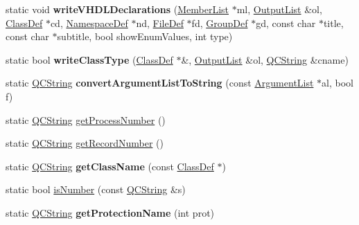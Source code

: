 \begin{DoxyCompactItemize}
static void {\bfseries write\+V\+H\+D\+L\+Declarations} (\mbox{\hyperlink{class_member_list}{Member\+List}} $\ast$ml, \mbox{\hyperlink{class_output_list}{Output\+List}} \&ol, \mbox{\hyperlink{class_class_def}{Class\+Def}} $\ast$cd, \mbox{\hyperlink{class_namespace_def}{Namespace\+Def}} $\ast$nd, \mbox{\hyperlink{class_file_def}{File\+Def}} $\ast$fd, \mbox{\hyperlink{class_group_def}{Group\+Def}} $\ast$gd, const char $\ast$title, const char $\ast$subtitle, bool show\+Enum\+Values, int type)
\item 
\mbox{\label{class_vhdl_doc_gen_a201149bb595839029a622100737e0dea}} 
static bool {\bfseries write\+Class\+Type} (\mbox{\hyperlink{class_class_def}{Class\+Def}} $\ast$\&, \mbox{\hyperlink{class_output_list}{Output\+List}} \&ol, \mbox{\hyperlink{class_q_c_string}{Q\+C\+String}} \&cname)
\item 
\mbox{\label{class_vhdl_doc_gen_aa77f9467a8af575f85643ececc8cf4e3}} 
static \mbox{\hyperlink{class_q_c_string}{Q\+C\+String}} {\bfseries convert\+Argument\+List\+To\+String} (const \mbox{\hyperlink{class_argument_list}{Argument\+List}} $\ast$al, bool f)
\item 
static \mbox{\hyperlink{class_q_c_string}{Q\+C\+String}} \mbox{\hyperlink{class_vhdl_doc_gen_a6524e8718f3f956610df4dfc71be204c}{get\+Process\+Number}} ()
\item 
static \mbox{\hyperlink{class_q_c_string}{Q\+C\+String}} \mbox{\hyperlink{class_vhdl_doc_gen_a2e65f831a03ff54d13240da96843cd60}{get\+Record\+Number}} ()
\item 
\mbox{\label{class_vhdl_doc_gen_a2c4458b0e27e9b97db254d082d1487d2}} 
static \mbox{\hyperlink{class_q_c_string}{Q\+C\+String}} {\bfseries get\+Class\+Name} (const \mbox{\hyperlink{class_class_def}{Class\+Def}} $\ast$)
\item 
static bool \mbox{\hyperlink{class_vhdl_doc_gen_a37b3bf29e7ec4cfe5c453f5a5d4e8f71}{is\+Number}} (const \mbox{\hyperlink{class_q_c_string}{Q\+C\+String}} \&s)
\item 
\mbox{\label{class_vhdl_doc_gen_a4325f5840fe29089b4d3ea4b8c8b0fef}} 
static \mbox{\hyperlink{class_q_c_string}{Q\+C\+String}} {\bfseries get\+Protection\+Name} (int prot)
\item 
\mbox{\label{class_vhdl_doc_gen_aa2a0267e84b178cc29681eeaea8cfe35}} 

\end{DoxyCompactItemize}
